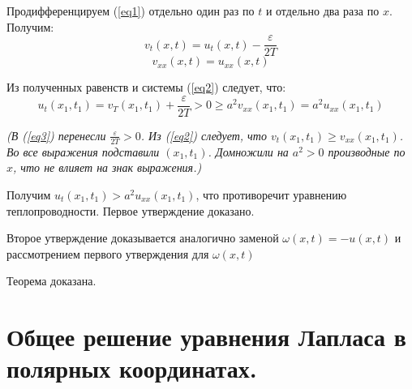 \documentclass[a6paper]{article}
\begin{document}
    Продифференцируем (\ref{eq1}) отдельно один раз по $t$ и отдельно два раза по $x$. Получим:
    \begin{equation}
        \label{eq3}
        v_t(x,t) = u_t(x,t) - \frac{\varepsilon}{2T}
    \end{equation}
    $$
    v_{xx}(x,t) = u_{xx}(x,t)
    $$
    
    Из полученных равенств и системы (\ref{eq2}) следует, что:
    $$
    u_t(x_1,t_1) = v_T(x_1,t_1) + \frac{\varepsilon}{2T} > 0 \geq a^2v_{xx}(x_1,t_1) = a^2u_{xx}(x_1,t_1)
    $$
    
    \textit{(В (\ref{eq3}) перенесли $\frac{\varepsilon}{2T} > 0$. Из (\ref{eq2}) следует, что $v_t(x_1,t_1) \geq v_{xx}(x_1,t_1)$. Во все выражения подставили $(x_1,t_1)$. Домножили на $a^2 > 0$ производные по $x$, что не влияет на знак выражения.)}
    
    Получим $u_t(x_1,t_1) > a^2u_{xx}(x_1,t_1)$, что противоречит уравнению теплопроводности. Первое утверждение доказано.
    \par
    Второе утверждение доказывается аналогично заменой $\omega(x,t) = -u(x,t)$ и рассмотрением первого утверждения для $\omega(x,t)$
    \par
    Теорема доказана.
    
    
    
    \section{Общее решение уравнения Лапласа в полярных координатах.}
    
\end{document}
